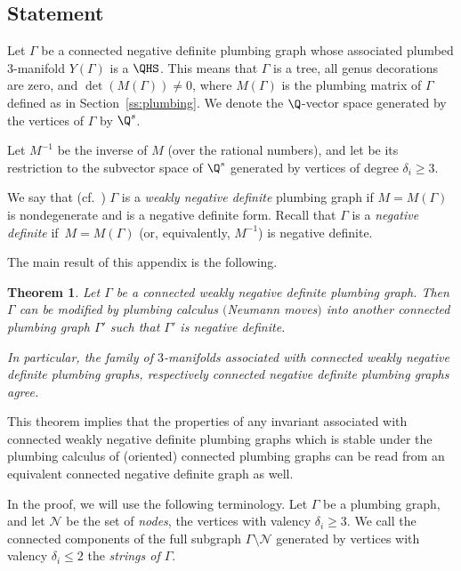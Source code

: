 \documentclass[10pt,a4paper]{amsart}
\newcounter{theorem}
\newtheorem{Theorem}{Theorem}[section]
\begin{document}
\subsection{Statement} Let $\Gamma$ be a connected negative definite plumbing graph whose associated plumbed 3-manifold $Y(\Gamma)$ is a $\QHS$. This means that $\Gamma$ is a tree, all genus decorations are zero, and $\det(M(\Gamma))\not=0$, where $M(\Gamma)$ is the plumbing matrix of $\Gamma$
 defined as in Section~\ref{ss:plumbing}. We denote the $\Q$-vector space generated by the vertices of $\Gamma$ by
 $\Q^s$.

 Let $M^{-1}$ be the inverse of $M$ (over the rational numbers), and let 
 be its restriction to the subvector space of $\Q^s$ generated by vertices of degree $\delta_i\geq 3$.

We say that (cf.~\cite[Definition~4.3]{GM21}) $\Gamma$ is a \emph{weakly negative definite} plumbing graph
if ${M\!=\!M(\Gamma)}$ is nondegenerate and  is a negative definite form.
Recall that $\Gamma$ is a {\it negative definite }
if~${M=M(\Gamma)}$ \big(or, equivalently, $M^{-1}$\big) is negative definite.

The main result of this appendix is the following.

\begin{Theorem}\label{th:app}
Let $\Gamma$ be a connected weakly negative definite plumbing graph. Then $\Gamma$ can be modified
 by plumbing calculus $($Neumann moves$)$ into another connected plumbing graph $\Gamma'$ such that
$\Gamma'$ is negative definite.

In particular, the family of $3$-manifolds associated with connected weakly negative definite plumbing graphs, respectively connected negative definite plumbing graphs agree.
\end{Theorem}

This theorem implies that the properties of any invariant associated with connected weakly negative definite plumbing graphs which is stable under the plumbing calculus of (oriented) connected plumbing graphs can be read from an equivalent
connected negative definite graph as well.

In the proof, we will use the following terminology.
Let $\Gamma$ be a plumbing graph, and let $\mathcal{N}$ be the set of \emph{nodes}, the vertices with valency $\delta_i\geq 3$. We call the connected components of the
full subgraph $\Gamma\setminus \mathcal{N}$
generated by vertices with valency $\delta_i\leq 2$ the \emph{strings of $\Gamma$}.
\end{document}
